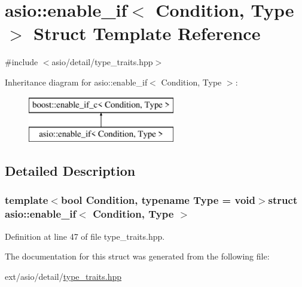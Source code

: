 \hypertarget{structasio_1_1enable__if}{}\section{asio\+:\+:enable\+\_\+if$<$ Condition, Type $>$ Struct Template Reference}
\label{structasio_1_1enable__if}


{\ttfamily \#include $<$asio/detail/type\+\_\+traits.\+hpp$>$}

Inheritance diagram for asio\+:\+:enable\+\_\+if$<$ Condition, Type $>$\+:\begin{figure}[H]
\begin{center}
\leavevmode
\includegraphics[height=2.000000cm]{structasio_1_1enable__if}
\end{center}
\end{figure}


\subsection{Detailed Description}
\subsubsection*{template$<$bool Condition, typename Type = void$>$struct asio\+::enable\+\_\+if$<$ Condition, Type $>$}



Definition at line 47 of file type\+\_\+traits.\+hpp.



The documentation for this struct was generated from the following file\+:\begin{DoxyCompactItemize}
\item 
ext/asio/detail/\hyperlink{asio_2detail_2type__traits_8hpp}{type\+\_\+traits.\+hpp}\end{DoxyCompactItemize}
